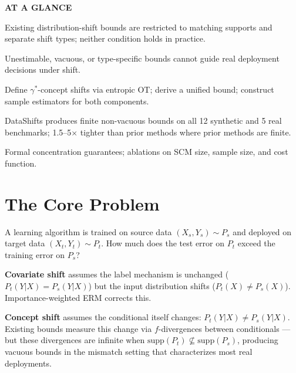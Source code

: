 \documentclass[10pt,twocolumn]{article}
\begin{document}
\begin{mdframed}[backgroundcolor=boxgray,linecolor=rulered,linewidth=1pt,
    innerleftmargin=6pt,innerrightmargin=6pt,
    innertopmargin=6pt,innerbottommargin=6pt]
\textbf{\small AT A GLANCE}\par\vspace{4pt}
\begin{description}[leftmargin=0pt,labelsep=4pt,itemsep=2pt,parsep=0pt,
    font=\small\bfseries]
  \item[Problem:] Existing distribution-shift bounds are restricted to
    matching supports and separate shift types; neither condition holds
    in practice.
  \item[Why it matters:] Unestimable, vacuous, or type-specific bounds
    cannot guide real deployment decisions under shift.
  \item[Method:] Define $\gamma^*$-concept shifts via entropic OT;
    derive a unified bound; construct sample estimators for both components.
  \item[Result:] DataShifts produces finite non-vacuous bounds on all
    12 synthetic and 5 real benchmarks; 1.5--5$\times$ tighter than
    prior methods where prior methods are finite.
  \item[Evidence:] Formal concentration guarantees; ablations on SCM
    size, sample size, and cost function.
\end{description}
\end{mdframed}

\section{The Core Problem}

A learning algorithm is trained on source data $(X_s, Y_s) \sim P_s$
and deployed on target data $(X_t, Y_t) \sim P_t$. How much does the
test error on $P_t$ exceed the training error on $P_s$?

\textbf{Covariate shift} assumes the label mechanism is unchanged
($P_t(Y|X) = P_s(Y|X)$) but the input distribution shifts
($P_t(X) \neq P_s(X)$). Importance-weighted ERM corrects this.

\textbf{Concept shift} assumes the conditional itself changes:
$P_t(Y|X) \neq P_s(Y|X)$. Existing bounds measure this change via
$f$-divergences between conditionals --- but these divergences are
infinite when $\mathrm{supp}(P_t) \not\subseteq \mathrm{supp}(P_s)$,
producing vacuous bounds in the mismatch setting that characterizes
most real deployments.
\end{document}
